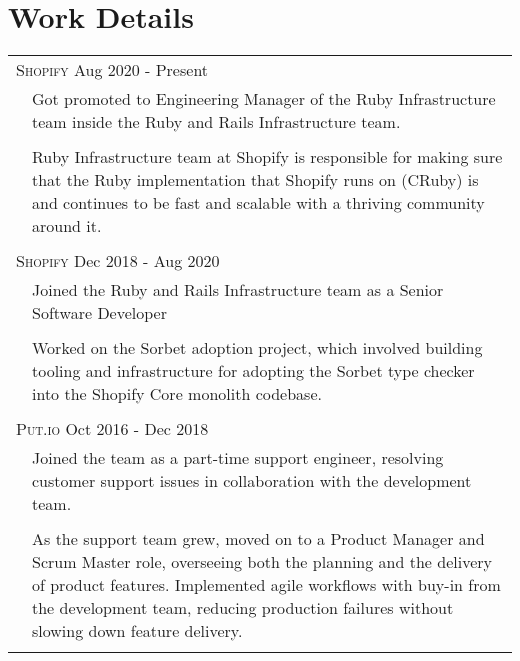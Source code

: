 \documentclass[a4paper,10pt]{article}
\newcommand{\exptitle}[2]{
  \multicolumn{2}{l}{\textsc{#1} \footnotesize{#2}} \\
  \specialrule{.01em}{0.5em}{1em}
}
\begin{document}
\newpage
\section{Work Details}
\begin{longtable}{r|p{11cm}}
  \exptitle{Shopify}{Aug 2020 - Present}

                                & Got promoted to Engineering Manager of the Ruby Infrastructure team inside the Ruby and Rails Infrastructure team. \\
                                & \\
                                & Ruby Infrastructure team at Shopify is responsible for making sure that the Ruby implementation that Shopify runs on (CRuby) is and continues to be fast and scalable with a thriving community around it.  \\

  \multicolumn{2}{c}{} \\

  \exptitle{Shopify}{Dec 2018 - Aug 2020}

                                & Joined the Ruby and Rails Infrastructure team as a Senior Software Developer \\
                                & \\
                                & Worked on the Sorbet adoption project, which involved building tooling and infrastructure for adopting the Sorbet type checker into the Shopify Core monolith codebase. \\

  \multicolumn{2}{c}{} \\

  \exptitle{Put.io}{Oct 2016 - Dec 2018}

                                &  Joined the team as a part-time support engineer, resolving customer support issues in collaboration with the development team. \\
                                & \\
                                & As the support team grew, moved on to a Product Manager and Scrum Master role, overseeing both the planning and the delivery of product features. Implemented agile workflows with buy-in from the development team, reducing production failures without slowing down feature delivery. \\

  \multicolumn{2}{c}{} \\


\end{longtable}
\end{document}

